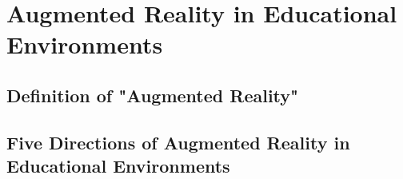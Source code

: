 \section{Augmented Reality in Educational Environments}
\subsection{Definition of "Augmented Reality"}
\subsection{Five Directions of Augmented Reality in Educational Environments}